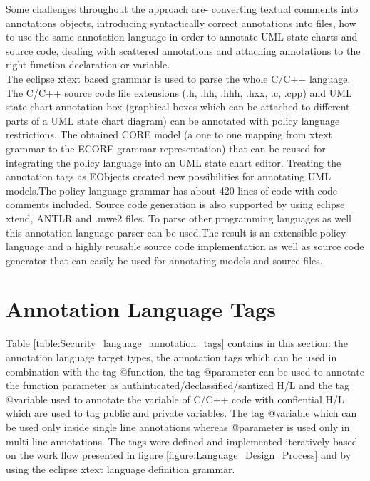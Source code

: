 Some challenges throughout the approach are- converting textual
comments into annotations objects, introducing syntactically
correct annotations into files, how to use the same annotation
language in order to annotate UML state charts and source
code, dealing with scattered annotations and attaching annotations to the right function declaration or variable.\\

The eclipse xtext based grammar is used to parse the whole C/C++ language. The C/C++ source code file extensions (.h, .hh, .hhh, .hxx, .c, .cpp) and UML state chart annotation box (graphical boxes
which can be attached to different parts of a UML state chart diagram) can be annotated with policy language restrictions. The obtained CORE model (a one to one mapping from xtext grammar to the ECORE grammar representation) that can be reused for integrating the policy language into an UML state chart editor. Treating the annotation tags as EObjects created new possibilities for annotating
UML models.The policy language grammar has about 420 lines of code with code comments included. Source code generation is also supported by using
eclipse xtend, ANTLR and .mwe2 files. To parse other programming languages as well this annotation language parser can be used.The result is an extensible policy language and a highly reusable source code implementation as well as source code generator that can easily be used for annotating models and source files.

\section{Annotation Language Tags}
Table \ref{table:Security_language_annotation_tags} contains in this section: the annotation language
target types, the annotation tags which can be used in
combination with the tag @function, the tag
@parameter can be used to annotate the function parameter as authinticated/declassified/santized H/L and the tag @variable used to annotate the variable of C/C++ code with confiential H/L which are used to tag public and private variables. The tag @variable which can be used only inside single line annotations whereas @parameter is used only in multi line annotations. The tags were
defined and implemented iteratively based on the work flow
presented in figure \ref{figure:Language_Design_Process} and by using the eclipse xtext \cite{ref_17_xtext:grammar} language
definition grammar.\\

